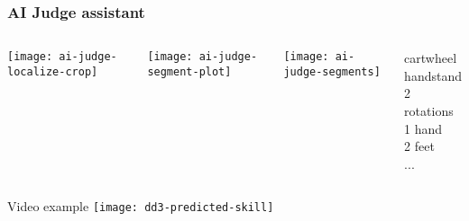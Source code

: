 \documentclass[aspectratio=169]{beamer}
\begin{document}
\begin{frame}
  \frametitle{AI Judge assistant}

  \begin{columns}[c]
  \end{columns}

  \begin{columns}[c]
  
    \begin{center}
      \texttt{[image: ai-judge-localize-crop]}
    \end{center}
    
    \begin{center}
      \texttt{[image: ai-judge-segment-plot]}
    \end{center}
    \begin{center}
      \texttt{[image: ai-judge-segments]}
    \end{center}

    
    \begin{center}
        cartwheel \\
        handstand \\
        2 rotations \\
        1 hand \\
        2 feet \\
        ... 
    \end{center}
      
  \end{columns}


\end{frame}

\begin{frame}{Video example}
  \texttt{[image: dd3-predicted-skill]} 
  
  
  \hypertarget{autoplay}{} %
  \href{run:dd3-annotated.mp4}{}


\end{frame}
\end{document}
